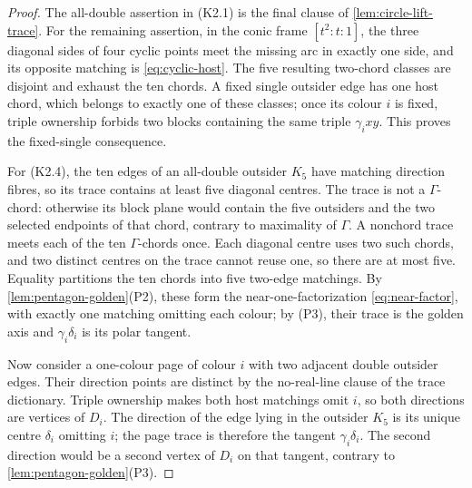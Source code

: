\begin{proof}
The all-double assertion in (K2.1) is the final clause of
\cref{lem:circle-lift-trace}.  For the remaining assertion, in the conic frame
$[t^2:t:1]$, the three diagonal sides of four cyclic points meet the missing
arc in exactly one side, and its opposite matching is \eqref{eq:cyclic-host}.
The five resulting two-chord classes are disjoint and exhaust the ten
chords.  A fixed single outsider edge has one host chord, which belongs to
exactly one of these classes; once its colour $i$ is fixed, triple ownership
forbids two blocks containing the same triple $\gamma_i xy$.  This proves
the fixed-single consequence.

For (K2.4), the ten edges of an all-double outsider $K_5$ have matching
direction fibres, so its trace contains at least five diagonal centres.
The trace is not a $\Gamma$-chord: otherwise its block plane would contain
the five outsiders and the two selected endpoints of that chord, contrary
to maximality of $\Gamma$.  A nonchord trace meets each of the ten
$\Gamma$-chords once.  Each diagonal centre uses two such chords, and two
distinct centres on the trace cannot reuse one, so there are at most five.
Equality partitions the ten chords into five two-edge matchings.
By \cref{lem:pentagon-golden}(P2), these form the near-one-factorization
\eqref{eq:near-factor}, with exactly one matching omitting each colour; by
(P3), their trace is the golden axis and $\gamma_i\delta_i$ is its polar
tangent.

Now consider a one-colour page of colour $i$ with two adjacent double
outsider edges.  Their direction points are distinct by the no-real-line
clause of the trace dictionary.  Triple ownership makes both host matchings
omit $i$, so both directions are vertices of $D_i$.  The direction of the
edge lying in the outsider $K_5$ is its unique centre $\delta_i$ omitting
$i$; the page trace is therefore the tangent $\gamma_i\delta_i$.  The
second direction would be a second vertex of $D_i$ on that tangent,
contrary to \cref{lem:pentagon-golden}(P3).
\end{proof}

